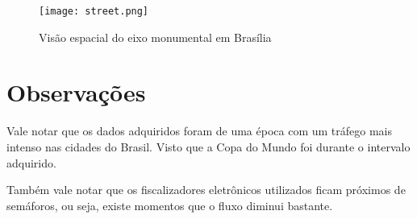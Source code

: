 \begin{figure}[t]
    \centering
    \texttt{[image: street.png]}
    \label{figure:eixo}
    \caption{Visão espacial do eixo monumental em Brasília}
\end{figure}


\section{Observações}

Vale notar que os dados adquiridos foram de uma época com um tráfego mais intenso nas cidades do Brasil. Visto que a Copa do Mundo foi durante o intervalo adquirido. 

Também vale notar que os fiscalizadores eletrônicos utilizados ficam próximos de semáforos, ou seja, existe momentos que o fluxo diminui bastante.